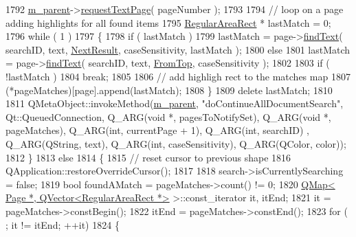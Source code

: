 \begin{DoxyCode}
1792             \hyperlink{classOkular_1_1DocumentPrivate_ac921eda41c014869ffec96ecc569c713}{m\_parent}->\hyperlink{classOkular_1_1Document_ad4909d8411d3ad8faf716f30a6e9f417}{requestTextPage}( pageNumber );
1793 
1794         \textcolor{comment}{// loop on a page adding highlights for all found items}
1795         \hyperlink{classOkular_1_1RegularAreaRect}{RegularAreaRect} * lastMatch = 0;
1796         \textcolor{keywordflow}{while} ( 1 )
1797         \{
1798             \textcolor{keywordflow}{if} ( lastMatch )
1799                 lastMatch = page->\hyperlink{classOkular_1_1Page_a02f1143ff5c69b04f4b514c04566864f}{findText}( searchID, text, \hyperlink{namespaceOkular_ad7ede3c5a1b1a8bfd83f133e7e3ed9d2ae206453ab991a0ffea7c198f8ef600c4}{NextResult}, caseSensitivity, 
      lastMatch );
1800             \textcolor{keywordflow}{else}
1801                 lastMatch = page->\hyperlink{classOkular_1_1Page_a02f1143ff5c69b04f4b514c04566864f}{findText}( searchID, text, \hyperlink{namespaceOkular_ad7ede3c5a1b1a8bfd83f133e7e3ed9d2a12e1e0d5fba44b6eb075863eb0992cf6}{FromTop}, caseSensitivity );
1802 
1803             \textcolor{keywordflow}{if} ( !lastMatch )
1804                 \textcolor{keywordflow}{break};
1805 
1806             \textcolor{comment}{// add highligh rect to the matches map}
1807             (*pageMatches)[page].append(lastMatch);
1808         \}
1809         \textcolor{keyword}{delete} lastMatch;
1810 
1811         QMetaObject::invokeMethod(\hyperlink{classOkular_1_1DocumentPrivate_ac921eda41c014869ffec96ecc569c713}{m\_parent}, \textcolor{stringliteral}{"doContinueAllDocumentSearch"}, Qt::QueuedConnection, 
      Q\_ARG(\textcolor{keywordtype}{void} *, pagesToNotifySet), Q\_ARG(\textcolor{keywordtype}{void} *, pageMatches), Q\_ARG(\textcolor{keywordtype}{int}, currentPage + 1), Q\_ARG(\textcolor{keywordtype}{int}, searchID)
      , Q\_ARG(QString, text), Q\_ARG(\textcolor{keywordtype}{int}, caseSensitivity), Q\_ARG(QColor, color));
1812     \}
1813     \textcolor{keywordflow}{else}
1814     \{
1815         \textcolor{comment}{// reset cursor to previous shape}
1816         QApplication::restoreOverrideCursor();
1817 
1818         search->isCurrentlySearching = \textcolor{keyword}{false};
1819         \textcolor{keywordtype}{bool} foundAMatch = pageMatches->count() != 0;
1820         \hyperlink{classQMap}{QMap< Page *, QVector<RegularAreaRect *>} >::const\_iterator 
      it, itEnd;
1821         it = pageMatches->constBegin();
1822         itEnd = pageMatches->constEnd();
1823         \textcolor{keywordflow}{for} ( ; it != itEnd; ++it)
1824         \{

\end{DoxyCode}
